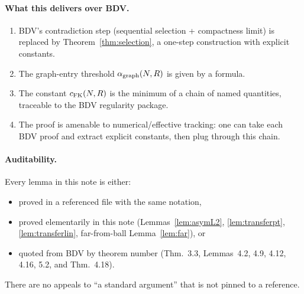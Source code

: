 \documentclass[11pt]{article}
\theoremstyle{definition}
\begin{document}
\paragraph{What this delivers over BDV.}
\begin{enumerate}
\item BDV's contradiction step (sequential selection + compactness limit)
is replaced by Theorem~\ref{thm:selection}, a one-step construction with
explicit constants.
\item The graph-entry threshold $\alpha_{\rm graph}(N,R)$ is given by a
formula.
\item The constant $c_{\rm FK}(N,R)$ is the minimum of a chain of named
quantities, traceable to the BDV regularity package.
\item The proof is amenable to numerical/effective tracking: one can take
each BDV proof and extract explicit constants, then plug through this
chain.
\end{enumerate}

\paragraph{Auditability.}
Every lemma in this note is either:
\begin{itemize}
\item proved in a referenced file with the same notation,
\item proved elementarily in this note (Lemmas~\ref{lem:asymL2},
\ref{lem:transferpt}, \ref{lem:transferlin}, far-from-ball
Lemma~\ref{lem:far}), or
\item quoted from BDV by theorem number (Thm.~3.3, Lemmas~4.2, 4.9, 4.12,
4.16, 5.2, and Thm.~4.18).
\end{itemize}
There are no appeals to ``a standard argument'' that is not pinned to a
reference.
\end{document}
